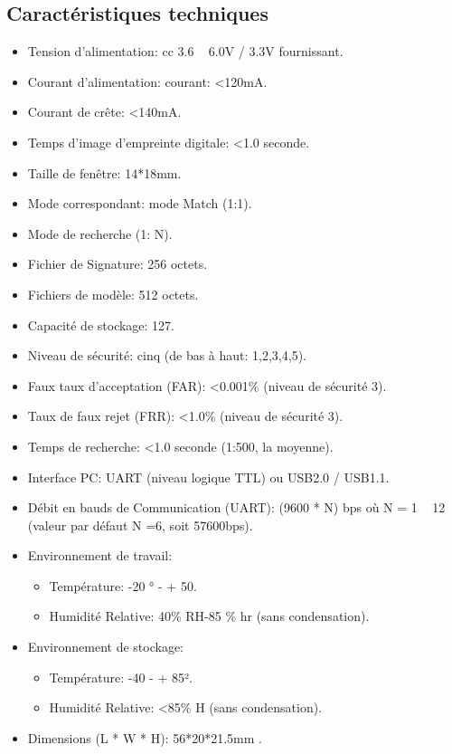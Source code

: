 \subsection{Caractéristiques techniques }
\begin{itemize}
    \item Tension d'alimentation: cc 3.6 ~ 6.0V / 3.3V fournissant.
    \item Courant d'alimentation: courant: <120mA.
    \item Courant de crête: <140mA.
    \item Temps d'image d'empreinte digitale: <1.0 seconde.
    \item Taille de fenêtre: 14*18mm.
    \item Mode correspondant: mode Match (1:1).
    \item Mode de recherche (1: N).
    \item Fichier de Signature: 256 octets.
    \item Fichiers de modèle: 512 octets.
    \item Capacité de stockage: 127.
    \item Niveau de sécurité: cinq (de bas à haut: 1,2,3,4,5).
    \item Faux taux d'acceptation (FAR): <0.001\% (niveau de sécurité 3).
    \item Taux de faux rejet (FRR): <1.0\% (niveau de sécurité 3).
    \item Temps de recherche: <1.0 seconde (1:500, la moyenne).
    \item Interface PC: UART (niveau logique TTL) ou USB2.0 / USB1.1.
    \item Débit en bauds de Communication (UART): (9600 * N) bps où N = 1 ~ 12 
        (valeur par défaut N =6, soit 57600bps).
    \item Environnement de travail:
        \begin{itemize}
            \item [\textbullet]Température: -20 ° - + 50.
            \item [\textbullet]Humidité Relative: 40\% RH-85 \% hr (sans condensation).
        \end{itemize}
    \item Environnement de stockage:
        \begin{itemize}
            \item [\textbullet] Température: -40 - + 85².
            \item [\textbullet] Humidité Relative: <85\% H (sans condensation).
        \end{itemize}
    \item Dimensions (L * W * H): 56*20*21.5mm .
\end{itemize}


